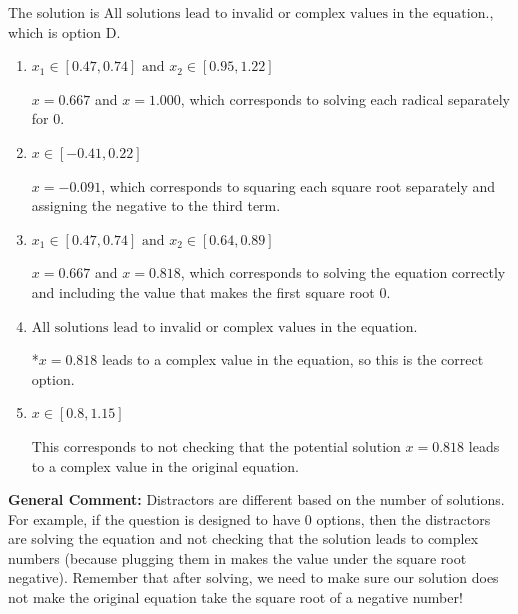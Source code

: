 \documentclass{extbook}[14pt]
\begin{document}
\begin{enumerate}
{The solution is \( \text{All solutions lead to invalid or complex values in the equation.} \), which is option D.\begin{enumerate}[label=\Alph*.]
\item \( x_1 \in [0.47, 0.74] \text{ and } x_2 \in [0.95,1.22] \)

$x = 0.667$ and $x = 1.000$, which corresponds to solving each radical separately for 0.
\item \( x \in [-0.41,0.22] \)

$x = -0.091$, which corresponds to squaring each square root separately and assigning the negative to the third term.
\item \( x_1 \in [0.47, 0.74] \text{ and } x_2 \in [0.64,0.89] \)

$x = 0.667$ and $x = 0.818$, which corresponds to solving the equation correctly and including the value that makes the first square root 0.
\item \( \text{All solutions lead to invalid or complex values in the equation.} \)

*$x = 0.818$ leads to a complex value in the equation, so this is the correct option.
\item \( x \in [0.8,1.15] \)

This corresponds to not checking that the potential solution $x = 0.818$ leads to a complex value in the original equation.
\end{enumerate}

\textbf{General Comment:} Distractors are different based on the number of solutions. For example, if the question is designed to have 0 options, then the distractors are solving the equation and not checking that the solution leads to complex numbers (because plugging them in makes the value under the square root negative). Remember that after solving, we need to make sure our solution does not make the original equation take the square root of a negative number!
}
\end{enumerate}
\end{document}
